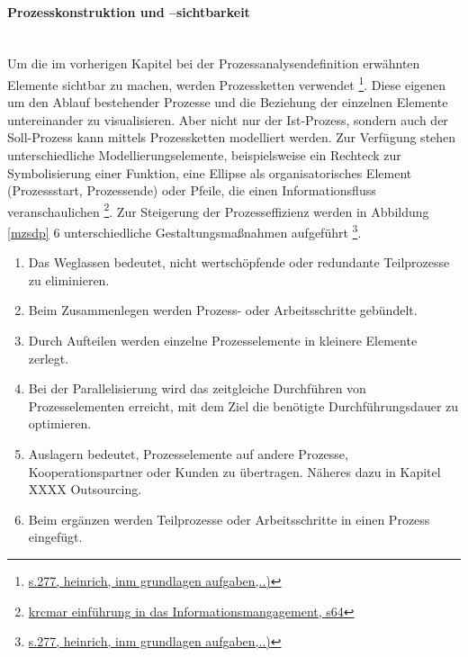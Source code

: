 \documentclass[a4paper, 12pt]{scrreprt}
\begin{document}
\paragraph{Prozesskonstruktion und –sichtbarkeit}\mbox{}\\
Um die im vorherigen Kapitel bei der Prozessanalysendefinition erwähnten Elemente sichtbar zu machen, werden Prozessketten verwendet \footnote{\url{s.277, heinrich, inm grundlagen aufgaben,..)}}. Diese eigenen um den Ablauf bestehender Prozesse und die Beziehung der einzelnen Elemente untereinander zu visualisieren. Aber nicht nur der Ist-Prozess, sondern auch der Soll-Prozess kann mittels Prozessketten modelliert werden. Zur Verfügung stehen unterschiedliche Modellierungselemente, beispielsweise ein Rechteck zur Symbolisierung einer Funktion, eine Ellipse als organisatorisches Element (Prozessstart, Prozessende) oder Pfeile, die einen Informationsfluss veranschaulichen \footnote{\url{krcmar einführung in das Informationsmangagement, s64}}.
Zur Steigerung der Prozesseffizienz werden in Abbildung \ref{mzsdp}  6 unterschiedliche Gestaltungsmaßnahmen aufgeführt \footnote{\url{s.277, heinrich, inm grundlagen aufgaben,..)}}. 
\begin{enumerate}
    \item Das Weglassen bedeutet, nicht wertschöpfende oder redundante Teilprozesse zu eliminieren.
    \item Beim Zusammenlegen werden Prozess- oder Arbeitsschritte gebündelt.  
    \item Durch Aufteilen werden einzelne Prozesselemente in kleinere Elemente zerlegt. 
    \item Bei der Parallelisierung wird das zeitgleiche Durchführen von Prozesselementen erreicht, mit dem Ziel die benötigte Durchführungsdauer zu optimieren. 
    \item Auslagern bedeutet, Prozesselemente auf andere Prozesse, Kooperationspartner oder Kunden zu übertragen. Näheres dazu in Kapitel XXXX Outsourcing. 
    \item Beim ergänzen werden Teilprozesse oder Arbeitsschritte in einen Prozess eingefügt.
\end{enumerate}
\end{document}
